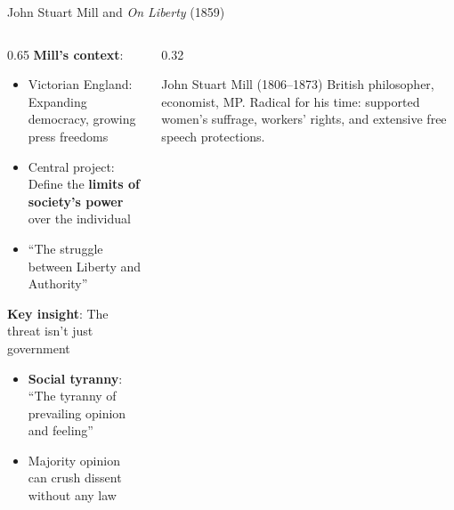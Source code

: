 ﻿\documentclass[aspectratio=169,11pt]{beamer}
\begin{document}
\begin{frame}{John Stuart Mill and \textit{On Liberty} (1859)}
\begin{columns}[T]
\begin{column}{0.65\textwidth}
\textbf{Mill's context}:
\begin{itemize}
    \item Victorian England: Expanding democracy, growing press freedoms
    \item Central project: Define the \textbf{limits of society's power} over the individual
    \item ``The struggle between Liberty and Authority''
\end{itemize}

\vspace{0.3cm}
\textbf{Key insight}: The threat isn't just government
\begin{itemize}
    \item \textbf{Social tyranny}: ``The tyranny of prevailing opinion and feeling''
    \item Majority opinion can crush dissent without any law
\end{itemize}
\end{column}

\begin{column}{0.32\textwidth}
\begin{block}{John Stuart Mill (1806--1873)}
\small
British philosopher, economist, MP. Radical for his time: supported women's suffrage, workers' rights, and extensive free speech protections.
\end{block}
\end{column}
\end{columns}
\end{frame}
\end{document}
